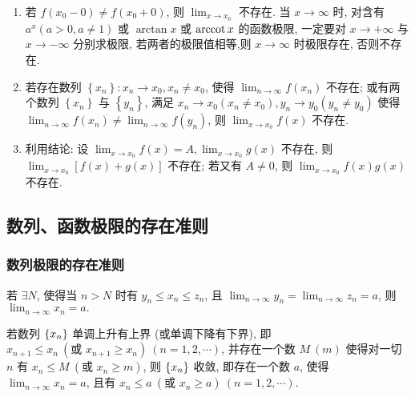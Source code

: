 \begin{enumerate}[label=(\arabic{*})]
    \item 若 $ f\left(x_{0}-0\right) \neq f\left(x_{0}+0\right)$, 则 $\displaystyle \lim _{x \rightarrow x_{0}} $ 不存在. 当 $ x \rightarrow \infty $ 时, 对含有 $ a^{x}(a>0, a \neq 1) $ 或 $ \arctan x $ 或 $ \arccot x $ 的函数极限, 一定要对 $ x \rightarrow+\infty $ 与 $ x \rightarrow-\infty $ 分别求极限, 若两者的极限值相等,则 $ x \rightarrow \infty $ 时极限存在, 否则不存在.
    \item 若存在数列 $ \left\{x_{n}\right\}: x_{n} \rightarrow x_{0}, x_{n} \neq x_{0} $, 使得 $\displaystyle \lim _{n \rightarrow \infty} f\left(x_{n}\right) $ 不存在; 或有两个数列 $ \left\{x_{n}\right\} $ 与 $ \left\{y_{n}\right\} $, 满足 $ x_{n} \rightarrow x_{0}\left(x_{n} \neq x_{0}\right), y_{n} \rightarrow y_{0}\left(y_{n} \neq y_{0}\right) $ 使得 $ \displaystyle\lim _{n \rightarrow \infty} f\left(x_{n}\right) \neq \lim _{n \rightarrow \infty} f\left(y_{n}\right) $, 则 $ \displaystyle\lim _{x \rightarrow x_{0}} f(x) $ 不存在.
    \item 利用结论: 设 $\displaystyle \lim _{x \rightarrow x_{0}} f(x)=A, \lim _{x \rightarrow x_{0}} g(x) $ 不存在, 则 $\displaystyle \lim _{x \rightarrow x_{0}}[f(x)+g(x)] $ 不存在; 若又有 $ A \neq 0 $, 则 $ \displaystyle\lim _{x \rightarrow x_{0}} f(x) g(x) $ 不存在.
\end{enumerate}

\subsection{数列、函数极限的存在准则}

\subsubsection{数列极限的存在准则}

\begin{theorem}[数列的夹逼准则]
    \label{pinchGuidelines}
    若 $\exists N$, 使得当 $n>N$ 时有 $y_n\leqslant x_n\leqslant z_n$, 且 $\displaystyle\lim_{n\to\infty}y_n=\lim_{n\to\infty}z_n=a$, 则 $\displaystyle\lim_{n\to\infty}x_n=a.$
\end{theorem}

\begin{theorem}[数列的单调有界准则]
    若数列 $\qty{x_n}$ 单调上升有上界 (或单调下降有下界), 即 $x_{n+1}\leqslant x_n~(\text{或 }x_{n+1}\geqslant x_n)~(n=1,2,\cdots)$, 并存在一个数 $M~ (m)$ 使得对一切 $n$ 有 $x_n\leqslant M~(\text{或 }x_n\geqslant m)$, 则 $\qty{x_n}$ 收敛, 即存在一个数 $a$, 使得 $\displaystyle\lim_{n\to\infty}x_n=a$, 且有 $x_n\leqslant a~(\text{或 }x_n\geqslant a)~(n=1,2,\cdots)$.
\end{theorem}

